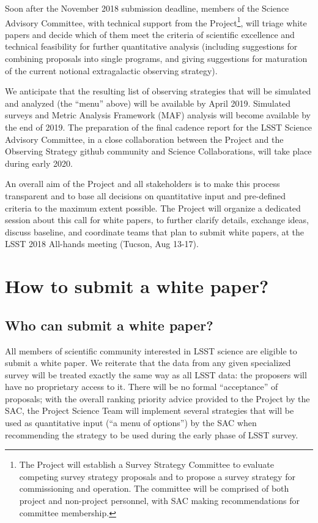 \documentclass[DM,lsstdraft,toc,usenatbib]{lsstdoc}
\begin{document}
Soon after the November 2018 submission deadline, members of the Science Advisory 
Committee, with technical support from the Project\footnote{The Project will establish a Survey Strategy Committee to evaluate competing 
survey strategy proposals and to propose a survey strategy for commissioning and operation. 
The committee will be comprised of both project and non-project personnel, with SAC making 
recommendations for committee membership.}, will 
triage white papers and decide which of them meet the criteria of scientific excellence and 
technical feasibility for further quantitative analysis (including suggestions for combining 
proposals into single programs, and giving suggestions for maturation of the current notional 
extragalactic observing strategy). 

We anticipate that the resulting list of observing strategies that will be simulated and analyzed 
(the ``menu'' above) will be available by April 2019. Simulated surveys and Metric Analysis 
Framework (MAF) analysis will become available by the end of 2019. The preparation of the final 
cadence report for the LSST Science Advisory Committee, in a close collaboration between 
the Project and the Observing Strategy github community and Science Collaborations, will take 
place during early 2020.  

An overall aim of the Project and all stakeholders is to make this process transparent and to base 
all decisions on quantitative input and pre-defined criteria to the maximum extent possible. 
The Project will organize a dedicated session about this call for white papers, to further clarify 
details, exchange ideas, discuss baseline, and coordinate teams that plan to submit white papers,
at the LSST 2018 All-hands meeting (Tucson, Aug 13-17). 


\section{How to submit a white paper?} 


\subsection{Who can submit a white paper?} 

All members of scientific community interested in LSST science are eligible to 
submit a white paper. We reiterate that the data from any given specialized survey 
will be treated exactly the same way as all LSST data: the proposers will have no 
proprietary access to it. There will be no formal ``acceptance'' of proposals; with
the overall ranking priority advice provided to the Project by the SAC, the Project
Science Team will implement several strategies that will be used as quantitative
input (``a menu of options'') by the SAC when recommending the strategy to be
used during the early phase of LSST survey. 
\end{document}

